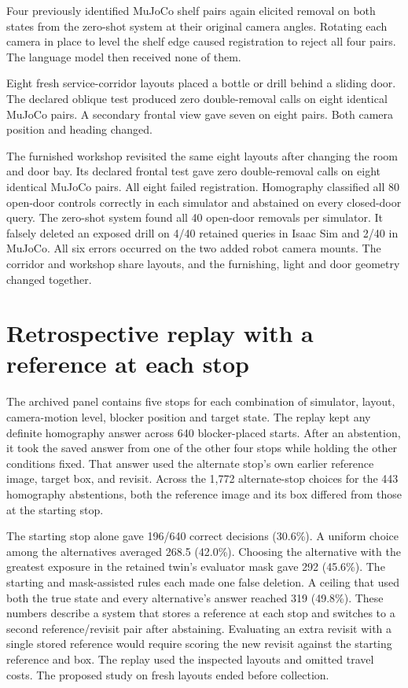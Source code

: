 Four previously identified MuJoCo shelf pairs again elicited removal on both states from the zero-shot system at their original camera angles. Rotating each camera in place to level the shelf edge caused registration to reject all four pairs. The language model then received none of them.

Eight fresh service-corridor layouts placed a bottle or drill behind a sliding door. The declared oblique test produced zero double-removal calls on eight identical MuJoCo pairs. A secondary frontal view gave seven on eight pairs. Both camera position and heading changed.

The furnished workshop revisited the same eight layouts after changing the room and door bay. Its declared frontal test gave zero double-removal calls on eight identical MuJoCo pairs. All eight failed registration. Homography classified all 80 open-door controls correctly in each simulator and abstained on every closed-door query. The zero-shot system found all 40 open-door removals per simulator. It falsely deleted an exposed drill on 4/40 retained queries in Isaac Sim and 2/40 in MuJoCo. All six errors occurred on the two added robot camera mounts. The corridor and workshop share layouts, and the furnishing, light and door geometry changed together.

\section{Retrospective replay with a reference at each stop}
\label{app:replay}

The archived panel contains five stops for each combination of simulator, layout, camera-motion level, blocker position and target state. The replay kept any definite homography answer across 640 blocker-placed starts. After an abstention, it took the saved answer from one of the other four stops while holding the other conditions fixed. That answer used the alternate stop's own earlier reference image, target box, and revisit. Across the 1,772 alternate-stop choices for the 443 homography abstentions, both the reference image and its box differed from those at the starting stop.

The starting stop alone gave 196/640 correct decisions (30.6\%). A uniform choice among the alternatives averaged 268.5 (42.0\%). Choosing the alternative with the greatest exposure in the retained twin's evaluator mask gave 292 (45.6\%). The starting and mask-assisted rules each made one false deletion. A ceiling that used both the true state and every alternative's answer reached 319 (49.8\%). These numbers describe a system that stores a reference at each stop and switches to a second reference/revisit pair after abstaining. Evaluating an extra revisit with a single stored reference would require scoring the new revisit against the starting reference and box. The replay used the inspected layouts and omitted travel costs. The proposed study on fresh layouts ended before collection.

